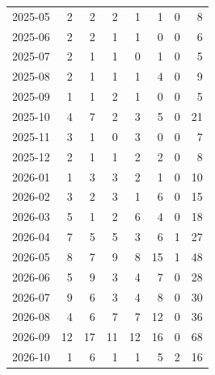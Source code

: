 \begin{tabular}{lrrrrrrr}
2025-05 & 2 & 2 & 2 & 1 & 1 & 0 & 8 \\
2025-06 & 2 & 2 & 1 & 1 & 0 & 0 & 6 \\
2025-07 & 2 & 1 & 1 & 0 & 1 & 0 & 5 \\
2025-08 & 2 & 1 & 1 & 1 & 4 & 0 & 9 \\
2025-09 & 1 & 1 & 2 & 1 & 0 & 0 & 5 \\
2025-10 & 4 & 7 & 2 & 3 & 5 & 0 & 21 \\
2025-11 & 3 & 1 & 0 & 3 & 0 & 0 & 7 \\
2025-12 & 2 & 1 & 1 & 2 & 2 & 0 & 8 \\
2026-01 & 1 & 3 & 3 & 2 & 1 & 0 & 10 \\
2026-02 & 3 & 2 & 3 & 1 & 6 & 0 & 15 \\
2026-03 & 5 & 1 & 2 & 6 & 4 & 0 & 18 \\
2026-04 & 7 & 5 & 5 & 3 & 6 & 1 & 27 \\
2026-05 & 8 & 7 & 9 & 8 & 15 & 1 & 48 \\
2026-06 & 5 & 9 & 3 & 4 & 7 & 0 & 28 \\
2026-07 & 9 & 6 & 3 & 4 & 8 & 0 & 30 \\
2026-08 & 4 & 6 & 7 & 7 & 12 & 0 & 36 \\
2026-09 & 12 & 17 & 11 & 12 & 16 & 0 & 68 \\
2026-10 & 1 & 6 & 1 & 1 & 5 & 2 & 16 \\
\bottomrule
\end{tabular}
